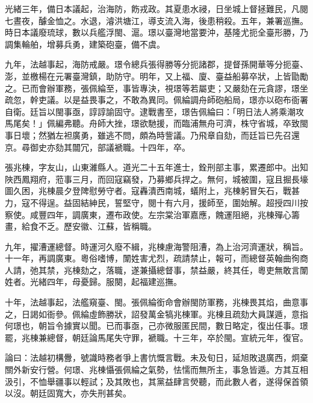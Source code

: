 \begin{pinyinscope}
光緒三年，備日本議起，治海防，飭戎政。其夏患水祲，日坐城上督拯難民，凡閱七晝夜，醵金恤之。水退，濬洪塘江，導支流入海，後患稍殺。五年，兼署巡撫。時日本議廢琉球，數以兵艦浮閩、滬。璟以臺灣地當要沖，基隆尤扼全臺形勝，乃調集輪舶，增募兵勇，建築砲臺，備不虞。

九年，法越事起，海防戒嚴。璟令總兵張得勝等分扼諸郡，提督孫開華等分扼臺、澎，並檄楊在元署臺灣鎮，助防守。明年，又上福、廈、臺益船募卒狀，上皆勖勵之。已而會辦軍務，張佩綸至，事皆專決，視璟等若屬吏；又嚴劾在元貪謬，璟坐疏忽，幹吏議。以是益畏事之，不敢為異同。佩綸調舟師砲船局，璟亦以砲布衙署自衛。廷旨以閩事亟，諄諄諭固守。逮戰書至，璟告佩綸曰：「明日法人將乘潮攻馬尾矣！」佩編弗聽。舟師大挫，璟欲馳援，而臨浦無舟可濟，株守省城，卒致閩事日壞；然猶左袒廣勇，雖逃不問，頗為時訾議。乃飛章自劾，而廷旨已先召還京。尋御史亦劾其闒冗，部議褫職。十四年，卒。

張兆棟，字友山，山東濰縣人。道光二十五年進士，銓刑部主事，累遷郎中。出知陜西鳳翔府，蒞事三月，而回寇竊發，乃募鄉兵捍之。無何，城被圍，寇且掘長壕圖久困，兆棟晨夕登陴慰勞守者。寇轟潰西南城，蟻附上，兆棟躬冒矢石，戰甚力，寇不得逞。益固結紳民，誓堅守，閱十有六月，援師至，圍始解。超授四川按察使。咸豐四年，調廣東，遷布政使。左宗棠治軍嘉應，餽運阻絕，兆棟殫心籌畫，給食不乏。歷安徽、江蘇，皆稱職。

九年，擢漕運總督。時運河久廢不緝，兆棟慮海警阻漕，為上治河濟運狀，稱旨。十一年，再調廣東。粵俗嗜博，闈姓害尤烈，疏請禁止，報可，而總督英翰曲徇商人請，弛其禁，兆棟劾之，落職，遂兼攝總督事，禁益嚴，終其任，粵吏無敢言闈姓者。光緒四年，母憂歸。服闋，起福建巡撫。

十年，法越事起，法艦窺臺、閩。張佩綸銜命會辦閩防軍務，兆棟畏其焰，曲意事之，日謁如衙參。佩綸虛飾勝狀，詔發萬金犒兆棟軍。兆棟且疏劾大員謀遁，意指何璟也，朝旨令據實以聞。已而事亟，己亦微服匿民間，數日略定，復出任事。璟罷，兆棟兼總督，朝廷論馬尾失守罪，褫職。十三年，卒於閩。宣統元年，復官。

論曰：法越初構釁，號識時務者爭上書忼慨言戰。未及旬日，延旭敗退廣西，炯棄關外新安行營。何璟、兆棟懾張佩綸之氣勢，怯懦而無所主，事急皆遁。方其互相汲引，不恤舉疆事以輕試；及其敗也，其黨益肆言熒聽，而此數人者，遂得保首領以沒。朝廷固寬大，亦失刑甚矣。


\end{pinyinscope}